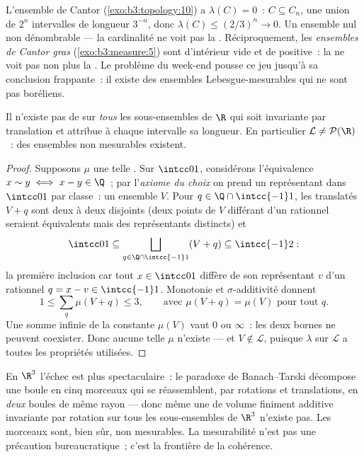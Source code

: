 \begin{example}\label{ex:b3:measure:cantor}
L'ensemble de Cantor (\cref{exo:b3:topology:10}) a $\lambda(C)
= 0$~: $C \subseteq C_n$, une union de $2^n$ intervalles de
longueur $3^{-n}$, donc $\lambda(C) \leq (2/3)^n \to 0$. Un
ensemble nul non dénombrable --- la cardinalité ne voit pas
la . Réciproquement, les \emph{ensembles de Cantor
gras} (\cref{exo:b3:measure:5}) sont d'intérieur vide et de
 positive~: la  ne voit pas non plus la
. Le problème du week-end pousse ce jeu jusqu'à sa
conclusion frappante~: il existe des ensembles
Lebesgue-mesurables qui ne sont pas boréliens.
\end{example}

\begin{theorem}[Vitali]\label{thm:b3:measure:vitali}
Il n'existe pas de  sur \emph{tous} les sous-ensembles
de $\R$ qui soit invariante par translation et attribue à
chaque intervalle sa longueur. En particulier $\mathcal L
\neq \mathcal P(\R)$~: des ensembles non mesurables
existent.
\end{theorem}

\begin{proof}
Supposons $\mu$ une telle . Sur $\intcc01$,
considérons l'équivalence $x \sim y \iff x - y \in \Q$~; par
l'\emph{axiome du choix} on prend un représentant dans
$\intcc01$ par classe~: un ensemble $V$. Pour $q \in
\Q\cap\intcc{-1}1$, les translatés $V + q$ sont deux à deux
disjoints (deux points de $V$ différant d'un rationnel
seraient équivalents mais des représentants distincts) et
\[
\intcc01 \subseteq \bigsqcup_{q \in \Q\cap\intcc{-1}1}(V + q)
\subseteq \intcc{-1}2 :
\]
la première inclusion car tout $x \in \intcc01$ diffère de
son représentant $v$ d'un rationnel $q = x - v \in
\intcc{-1}1$. Monotonie et $\sigma$-additivité donnent
\[
1 \leq \sum_{q}\mu(V + q) \leq 3,
\qquad\text{avec } \mu(V + q) = \mu(V) \text{ pour tout } q .
\]
Une somme infinie de la constante $\mu(V)$ vaut $0$ ou
$\infty$~: les deux bornes ne peuvent coexister. Donc aucune
telle $\mu$ n'existe --- et $V \notin \mathcal L$, puisque
$\lambda$ sur $\mathcal L$ a toutes les propriétés utilisées.
\end{proof}

\begin{remark}\label{rem:b3:measure:banachtarski}
En $\R^3$ l'échec est plus spectaculaire~: le paradoxe de
Banach--Tarski décompose une boule en cinq morceaux qui se
réassemblent, par rotations et translations, en
\emph{deux} boules de même rayon --- donc même une  de
volume finiment additive invariante par rotation sur tous les
sous-ensembles de $\R^3$ n'existe pas. Les morceaux sont,
bien sûr, non mesurables. La mesurabilité n'est pas une
précaution bureaucratique~; c'est la frontière de la
cohérence.
\end{remark}

